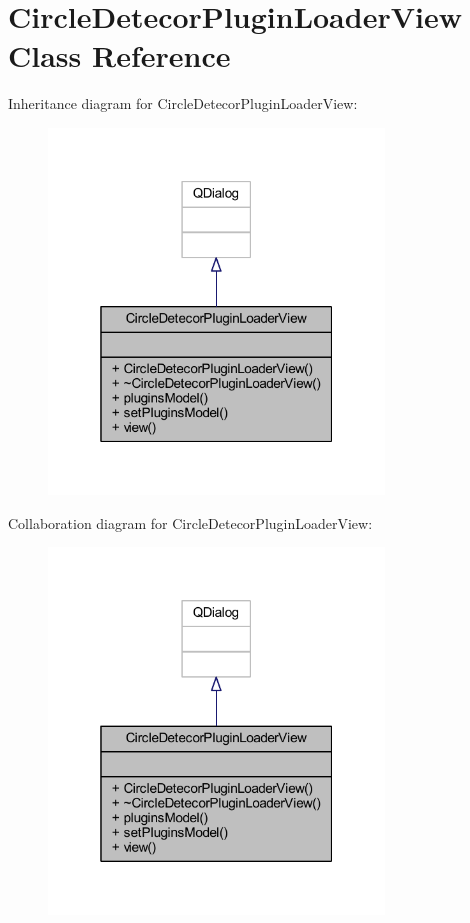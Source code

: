 \hypertarget{class_circle_detecor_plugin_loader_view}{}\section{Circle\+Detecor\+Plugin\+Loader\+View Class Reference}
\label{class_circle_detecor_plugin_loader_view}


Inheritance diagram for Circle\+Detecor\+Plugin\+Loader\+View\+:\nopagebreak
\begin{figure}[H]
\begin{center}
\leavevmode
\includegraphics[width=253pt]{de/d4b/class_circle_detecor_plugin_loader_view__inherit__graph}
\end{center}
\end{figure}


Collaboration diagram for Circle\+Detecor\+Plugin\+Loader\+View\+:\nopagebreak
\begin{figure}[H]
\begin{center}
\leavevmode
\includegraphics[width=253pt]{d4/dcb/class_circle_detecor_plugin_loader_view__coll__graph}
\end{center}
\end{figure}
